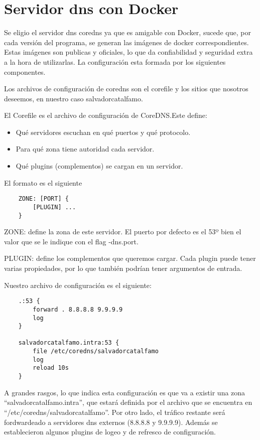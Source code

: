 \section{Servidor dns con Docker}

Se eligio el servidor dns coredns ya que es amigable con Docker, sucede que, por cada versión del 
programa, se generan las imágenes de docker correspondientes. Estas imágenes son publicas y oficiales, 
lo que da confiabilidad y seguridad extra a la hora de utilizarlas. La configuración esta formada por 
los siguientes componentes.

Los archivos de configuración de coredns son el corefile y los sitios que nosotros deseemos, en nuestro 
caso salvadorcatalfamo.

El Corefile es el archivo de configuración de CoreDNS.Este define:
\begin{itemize}
    \item Qué servidores escuchan en qué puertos y qué protocolo.
    \item Para qué zona tiene autoridad cada servidor.
    \item Qué plugins (complementos) se cargan en un servidor.
\end{itemize}

\noindent El formato es el siguiente
\begin{verbatim}
    ZONE: [PORT] {
        [PLUGIN] ...
    }
\end{verbatim}

\noindent ZONE: define la zona de este servidor. El puerto por defecto es el 53º bien el valor que se le indique 
con el flag -dns.port.

\noindent PLUGIN: define los complementos que queremos cargar. Cada plugin puede tener varias propiedades, por 
lo que también podrían tener argumentos de entrada.

\noindent Nuestro archivo de configuración es el siguiente:
\begin{verbatim}
    .:53 {
        forward . 8.8.8.8 9.9.9.9
        log
    }

    salvadorcatalfamo.intra:53 {
        file /etc/coredns/salvadorcatalfamo
        log
        reload 10s
    }    
\end{verbatim}

A grandes rasgos, lo que indica esta configuración es que va a existir una zona 
“salvadorcatalfamo.intra”, que estará definida por el archivo que se encuentra en 
“/etc/coredns/salvadorcatalfamo”. Por otro lado, el tráfico restante será fordwardeado a 
servidores dns externos (8.8.8.8 y 9.9.9.9). Además se establecieron algunos plugins de logeo y 
de refresco de configuración.

